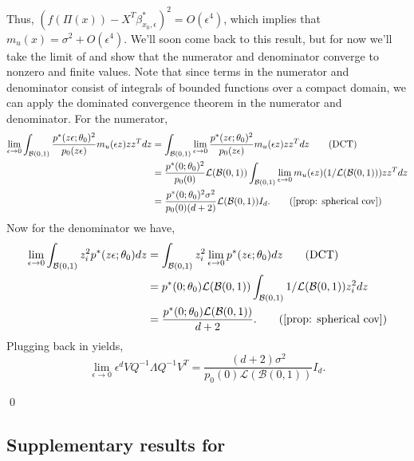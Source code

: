 \documentclass[11pt]{article}
\begin{document}
Thus, $(f(\Pi(x))  - X^T\beta^*_{x_0, \epsilon})^2 = O(\epsilon^4)$, which implies that $m_u(x) = \sigma^2 + O(\epsilon^4)$. We'll soon come back to this result, but for now we'll take the limit of  and show that the numerator and denominator converge to nonzero and finite values. Note that since terms in the numerator and denominator consist of integrals of bounded functions over a compact domain, we can apply the dominated convergence theorem in the numerator and denominator. For the numerator,
\begin{align*}
    \lim_{\epsilon \rightarrow 0} \int_{\mathcal{B}(0, 1)} \frac{p^*(z\epsilon; \theta_0)^2}{p_0(z\epsilon)}m_u(\epsilon z)zz^T dz &= \int_{\mathcal{B}(0, 1)} \lim_{\epsilon \rightarrow 0}\frac{p^*(z\epsilon; \theta_0)^2}{p_0(z\epsilon)}m_u(\epsilon z)zz^T dz \tag{DCT} \\
    &= \frac{p^*(0; \theta_0)^2}{p_0(0)} \mathcal{L}(\mathcal{B}(0, 1))\int_{\mathcal{B}(0, 1)} \lim_{\epsilon \rightarrow 0}m_u(\epsilon z)(1/\mathcal{L}(\mathcal{B}(0, 1)))zz^T dz \\
    &= \frac{p^*(0; \theta_0)^2\sigma^2}{p_0(0)(d+2)} \mathcal{L}(\mathcal{B}(0, 1))I_d. \tag{\Cref{prop: spherical cov}}
\end{align*}
Now for the denominator we have,
\begin{align*}
    \lim_{\epsilon \rightarrow 0}\int_{\mathcal{B}(0, 1)}z_i^2p^*(z\epsilon; \theta_0) dz &= \int_{\mathcal{B}(0, 1)}z_i^2\lim_{\epsilon \rightarrow 0}p^*(z\epsilon; \theta_0) dz \tag{DCT} \\
    &= p^*(0; \theta_0)\mathcal{L}(\mathcal{B}(0,1))\int_{\mathcal{B}(0, 1)}1/\mathcal{L}(\mathcal{B}(0,1))z_i^2 dz \\
    &= \frac{p^*(0; \theta_0)\mathcal{L}(\mathcal{B}(0,1))}{d+2}. \tag{\Cref{prop: spherical cov}}
\end{align*}
Plugging back in yields,
\[\lim_{\epsilon \rightarrow 0}\epsilon^dVQ^{-1}\Lambda Q^{-1}V^T = \frac{(d+2)\sigma^2}{p_0(0)\mathcal{L}(\mathcal{B}(0,1))}I_d.\]

\qed{}

\subsection{Supplementary results for }
\end{document}
